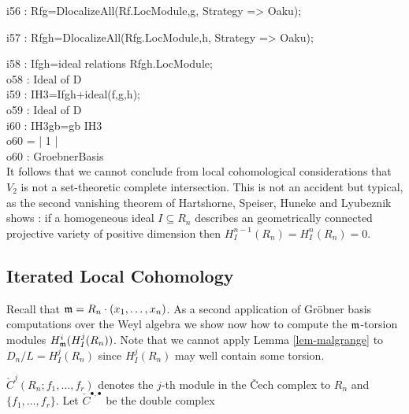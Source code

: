 \begin{example}
\beginOutput
i56 : Rfg=DlocalizeAll(Rf.LocModule,g, Strategy => Oaku);\\
\endOutput
          
\beginOutput
i57 : Rfgh=DlocalizeAll(Rfg.LocModule,h, Strategy => Oaku);\\
\endOutput
          
\beginOutput
i58 : Ifgh=ideal relations Rfgh.LocModule;\\
\emptyLine
o58 : Ideal of D\\
\endOutput
\beginOutput
i59 : IH3=Ifgh+ideal(f,g,h);\\
\emptyLine
o59 : Ideal of D\\
\endOutput
\beginOutput
i60 : IH3gb=gb IH3\\
\emptyLine
o60 = | 1 |\\
\emptyLine
o60 : GroebnerBasis\\
\endOutput
It follows that we cannot conclude from local cohomological
considerations that $V_2$ is not a set-theoretic complete
intersection. This is not an accident but typical, as the second
vanishing theorem 
of Hartshorne, Speiser, Huneke and Lyubeznik shows
\cite{DM:CDAV,DM:H-Sp,DM:Hu-L}: if a homogeneous ideal $I\subseteq R_n$
describes an geometrically connected projective variety of positive
dimension then $H^{n-1}_I(R_n)=H^{n}_I (R_n)=0$.
\end{example}


\subsection{Iterated Local Cohomology}

Recall that ${\mathfrak m}=R_n\cdot(x_1,\ldots,x_n)$. 
As a second application of Gr\"ob\-ner basis computations over the
Weyl algebra we
show now how to compute the ${\mathfrak m}$-torsion modules $H^i_{\mathfrak m} (H^j_I(R_n))$.
Note that we cannot apply Lemma \ref{lem-malgrange} to $D_n/L=H^j_I(R_n)$
since $H^j_I(R_n)$ may well 
contain some torsion.

$\check C^j(R_n;f_1,\ldots,f_r)$ denotes the $j$-th
module in the 
\v Cech complex to $R_n$ and $\{f_1,\ldots,f_r\}$. 
Let $\check C^{\bullet,\bullet}$ be the double complex 

